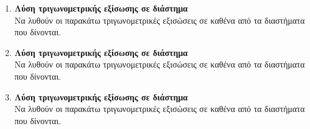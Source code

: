 \documentclass[twoside,nofonts,internet]{askhseis}
\begin{document}
\begin{enumerate}
\begin{rlist}
\item $ \hm{x}=\frac{\sqrt{2}}{2}\ ,\ x\in[0,\pi] $
\item $ \hm{x}=\frac{\sqrt{3}}{2}\ ,\ x\in\left[\frac{\pi}{2},\frac{3\pi}{2}\right]  $
\item $ \hm{x}=1\ ,\ x\in(\pi,3\pi] $
\end{rlist}
\item \textbf{Λύση τριγωνομετρικής εξίσωσης σε διάστημα}\\
Να λυθούν οι παρακάτω τριγωνομετρικές εξισώσεις σε καθένα από τα διαστήματα που δίνονται.
\begin{rlist}
\item $ \syn{x}=\frac{\sqrt{2}}{2}\ ,\ x\in\left[0,\pi\right]  $
\item $ \syn{x}=\frac{\sqrt{3}}{2}\ ,\ x\in[0,\frac{\pi}{2}] $
\item $ \syn{x}=\frac{1}{2}\ ,\ x\in\left[0,2\pi\right]  $
\item $ \syn{x}=0\ ,\ x\in[\pi,3\pi) $
\end{rlist}
\item \textbf{Λύση τριγωνομετρικής εξίσωσης σε διάστημα}\\
Να λυθούν οι παρακάτω τριγωνομετρικές εξισώσεις σε καθένα από τα διαστήματα που δίνονται.
\begin{rlist}
\item $ \ef{x}=\frac{\sqrt{3}}{3}\ ,\ x\in\left[0,\pi\right]  $
\item $ \ef{x}=\sqrt{3}\ ,\ x\in\left[ \pi,\frac{3\pi}{2}\right]  $
\item $ \syf{x}=1\ ,\ x\in\left[0,2\pi\right]  $
\item $ \ef{x}=0\ ,\ x\in[3\pi,4\pi) $
\end{rlist}
\item \textbf{Λύση τριγωνομετρικής εξίσωσης σε διάστημα}\\
Να λυθούν οι παρακάτω τριγωνομετρικές εξισώσεις σε καθένα από τα διαστήματα που δίνονται.

\end{enumerate}
\end{document}
